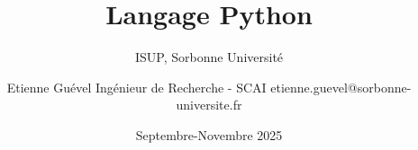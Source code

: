 \title{Langage Python}
\subtitle{ISUP, Sorbonne Université}
\author{Etienne Guével Ingénieur de Recherche - SCAI \footnotesize{etienne.guevel@sorbonne-universite.fr}}
\date{Septembre-Novembre 2025}
